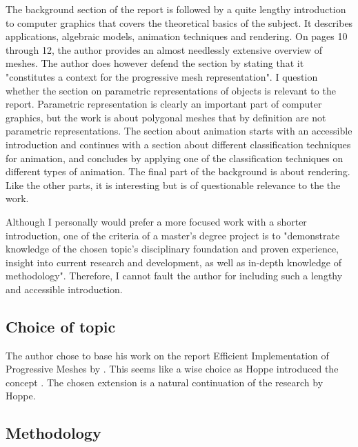 \documentclass{article}
\begin{document}
The background section of the report is followed by a quite lengthy introduction
to computer graphics that covers the theoretical basics of the subject. It
describes applications, algebraic models, animation techniques and rendering. On
pages 10 through 12, the author provides an almost needlessly extensive overview
of meshes. The author does however defend the section by stating that it
"constitutes a context for the progressive mesh representation". I question
whether the section on parametric representations of objects is relevant to the
report. Parametric representation is clearly an important part of computer
graphics, but the work is about polygonal meshes that by definition are not
parametric representations. The section about animation starts with an
accessible introduction and continues with a section about different
classification techniques for animation, and concludes by applying one of the
classification techniques on different types of animation. The final part of the
background is about rendering. Like the other parts, it is interesting but is of
questionable relevance to the the work.

Although I personally would prefer a more focused work with a shorter
introduction, one of the criteria of a master's degree project is to
"demonstrate knowledge of the chosen topic's disciplinary foundation and proven
experience, insight into current research and development, as well as in-depth
knowledge of methodology". Therefore, I cannot fault the author for including
such a lengthy and accessible introduction.

\subsection{Choice of topic}

The author chose to base his work on the report Efficient Implementation of
Progressive Meshes by \citet{hoppe1998}. This seems like a wise choice
as Hoppe introduced the concept \citep{hoppe}. The chosen extension is a natural
continuation of the research by Hoppe.

\subsection{Methodology}



\end{document}
